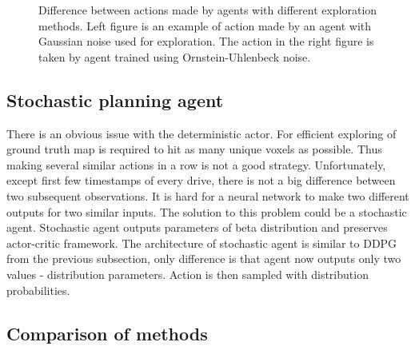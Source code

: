 \begin{figure}[H]
\begin{subfigure}[h]{0.5\linewidth}
\end{subfigure}
\captionsetup{width=1\textwidth}
\caption[Difference between exploration methods]{Difference between actions made by agents with different exploration methods. Left figure is an example of action made by an agent with Gaussian noise used for exploration. The action in the right figure is taken by agent trained using Ornstein-Uhlenbeck noise.}
\label{fig:expdiff}
\end{figure}

\subsection{Stochastic planning agent}
There is an obvious issue with the deterministic actor. For efficient exploring of ground truth map is required to hit as many unique voxels as possible. Thus making several similar actions in a row is not a good strategy. Unfortunately, except first few timestamps of every drive, there is not a big difference between two subsequent observations. It is hard for a neural network to make two different outputs for two similar inputs. The solution to this problem could be a stochastic agent. Stochastic agent outputs parameters of beta distribution and preserves actor-critic framework. The architecture of stochastic agent is similar to DDPG from the previous subsection, only difference is that agent now outputs only two values - distribution parameters. Action is then sampled with distribution probabilities.

\clearpage
\subsection{Comparison of methods}
